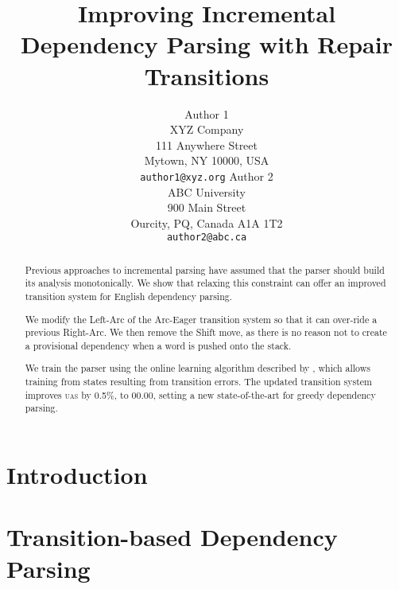 \documentclass[11pt,letterpaper]{article}
\title{Improving Incremental Dependency Parsing with Repair Transitions}
\author{Author 1\\
	    XYZ Company\\
	    111 Anywhere Street\\
	    Mytown, NY 10000, USA\\
	    {\tt author1@xyz.org}
	  \And
	Author 2\\
  	ABC University\\
  	900 Main Street\\
  	Ourcity, PQ, Canada A1A 1T2\\
  {\tt author2@abc.ca}}
\date{}
\newcommand{\sysacc}{00.00\xspace}
\newcommand{\uas}{\textsc{uas}\xspace}
\begin{document}
\maketitle
\begin{abstract}
    Previous approaches to incremental parsing have assumed that the parser
    should build its analysis monotonically. We show that relaxing this constraint
    can offer an improved transition system for English dependency parsing.

    We modify the Left-Arc of the Arc-Eager transition system so that it can 
    over-ride a previous Right-Arc. We then remove the Shift move, as there is no
    reason not to create a provisional dependency when a word is pushed onto the stack.

    We train the parser using the online learning algorithm described by
    \citet{goldberg:12}, which allows training from states resulting from
    transition errors. The updated transition system improves \uas by
    0.5\%, to \sysacc, setting a new state-of-the-art for greedy dependency parsing.
\end{abstract}

\section{Introduction}

\clearpage

\section{Transition-based Dependency Parsing}
\pagebreak
\end{document}
